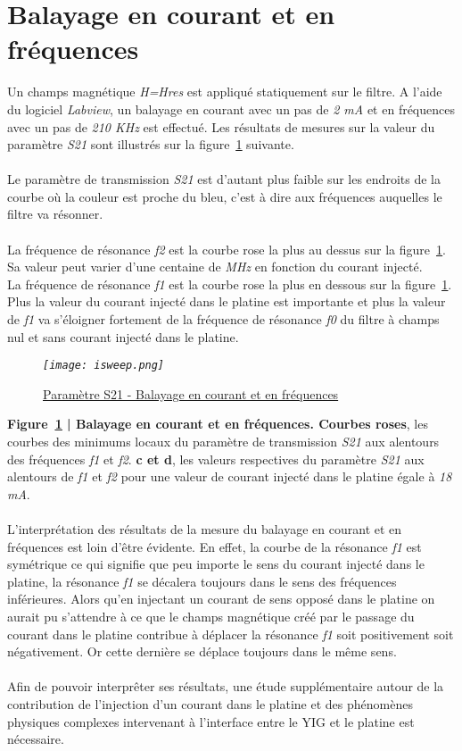 \documentclass[12pt,fleqn]{book} %
\begin{document}
\section{Balayage en courant et en fréquences}
\noindent Un champs magnétique \emph{H=Hres} est appliqué statiquement sur le filtre. A l'aide du logiciel \emph{Labview}, un balayage en courant avec un pas de \emph{2 mA} et en fréquences avec un pas de \emph{210 KHz} est effectué. Les résultats de mesures sur la valeur du paramètre \emph{S21} sont illustrés sur la figure~\underline{\color{blue}\ref{isweep}} suivante.
~\\\\Le paramètre de transmission \emph{S21} est d'autant plus faible sur les endroits de la courbe où la couleur est proche du bleu, c'est à dire aux fréquences auquelles le filtre va résonner.
~\\\\La fréquence de résonance \emph{f2} est la courbe rose la plus au dessus sur la figure~\underline{\color{blue}\ref{isweep}}. Sa valeur peut varier d'une centaine de \emph{MHz} en fonction du courant injecté.
~\\La fréquence de résonance \emph{f1} est la courbe rose la plus en dessous sur la figure~\underline{\color{blue}\ref{isweep}}. Plus la valeur du courant injecté dans le platine est importante et plus la valeur de \emph{f1} va s'éloigner fortement de la fréquence de résonance \emph{f0} du filtre à champs nul et sans courant injecté dans le platine.
\begin{figure}[H]
	\centering
	\itshape
	\texttt{[image: isweep.png]}
	\caption{\label{isweep} \underline{Paramètre S21 - Balayage en courant et en fréquences}}
\end{figure}
\noindent\footnotesize\textbf{Figure~\underline{\color{blue}\ref{isweep}} | Balayage en courant et en fréquences. Courbes roses}, les courbes des minimums locaux du paramètre de transmission \emph{S21} aux alentours des fréquences \emph{f1} et \emph{f2}. \textbf{c et d}, les valeurs respectives du paramètre \emph{S21} aux alentours de \emph{f1} et  \emph{f2} pour une valeur de courant injecté dans le platine égale à \emph{18 mA}.
\normalsize 
~\\\\L'interprétation des résultats de la mesure du balayage en courant et en fréquences est loin d'être évidente. En effet, la courbe de la résonance \emph{f1} est symétrique ce qui signifie que peu importe le sens du courant injecté dans le platine, la résonance \emph{f1} se décalera toujours dans le sens des fréquences inférieures. Alors qu'en injectant un courant de sens opposé dans le platine on aurait pu s'attendre à ce que le champs magnétique créé par le passage du courant dans le platine contribue à déplacer la résonance \emph{f1} soit positivement soit négativement. Or cette dernière se déplace toujours dans le même sens.
~\\\\Afin de pouvoir interprêter ses résultats, une étude supplémentaire autour de la contribution de l'injection d'un courant dans le platine et des phénomènes physiques complexes intervenant à l'interface entre le YIG et le platine est nécessaire.
\end{document}
